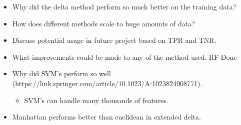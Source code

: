 \begin{itemize}
    \item Why did the delta method perform so much better on the training data?
    \item How does different methods scale to huge amounts of data?
    \item Discuss potential usage in future project based on TPR and TNR.
    \item What improvements could be made to any of the method used. RF Done
    \item Why did SVM's perform so well (https://link.springer.com/article/10.1023/A:1023824908771).
        \begin{itemize}
            \item SVM's can handle many thousands of features.
        \end{itemize}
    \item Manhattan performs better than euclidean in extended delta.
\end{itemize}
